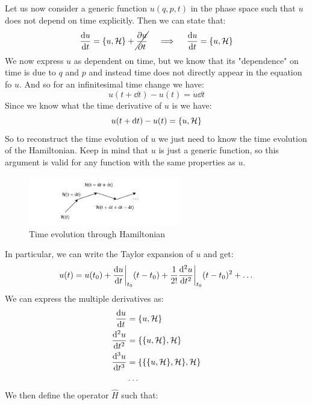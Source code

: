 Let us now consider a generic function $u(q,p,t)$ in the phase space such that $u$ does not depend on time explicitly. Then we can state that:
\begin{equation}
  \dv{u}{t} = \pb{u}{\hamfun} + \cancel{\pdv{u}{t}} \quad \implies \quad  \dv{u}{t} = \pb{u}{\hamfun}
\end{equation}
We now express $u$ as dependent on time, but we know that its "dependence" on time is due to $q$ and $p$ and instead time does not directly appear in the equation fo $u$. And so for an infinitesimal time change we have:
\begin{equation}
  u(t+\dd{t}) - u(t) = \dot{u}\dd{t}
\end{equation}
Since we know what the time derivative of $u$ is we have:
\begin{equation}
  u(t+\dd{t}) - u(t) = \pb{u}{\hamfun}
\end{equation}
So to reconstruct the time evolution of $u$ we just need to know the time evolution of the Hamiltonian. Keep in mind that $u$ is just a generic function, so this argument is valid for any function with the same properties as $u$.
\begin{figure}[H]
  \centering
  \includegraphics[width=0.6\textwidth]{res/svg/hamiltonian_time_evolution.drawio}
  \caption{Time evolution through Hamiltonian}
\end{figure}
In particular, we can write the Taylor expansion of $u$ and get:
\begin{equation}
  u(t) = u(t_0) + \dv{u}{t}\bigg|_{t_0} (t - t_0) + \frac{1}{2!} \dv[2]{u}{t}\bigg|_{t_0} (t - t_0)^2 + \dots
\end{equation}
We can express the multiple derivatives as:
\begin{equation}
  \begin{split}
    \dv{u}{t} &= \pb{u}{\hamfun}\\
    \dv[2]{u}{t} &= \pb{\pb{u}{\hamfun}}{\hamfun}\\
    \dv[3]{u}{t} &= \pb{\pb{\pb{u}{\hamfun}}{\hamfun}}{\hamfun}\\
    &\dots
  \end{split}
\end{equation}
We then define the operator $\hat{H}$ such that:
